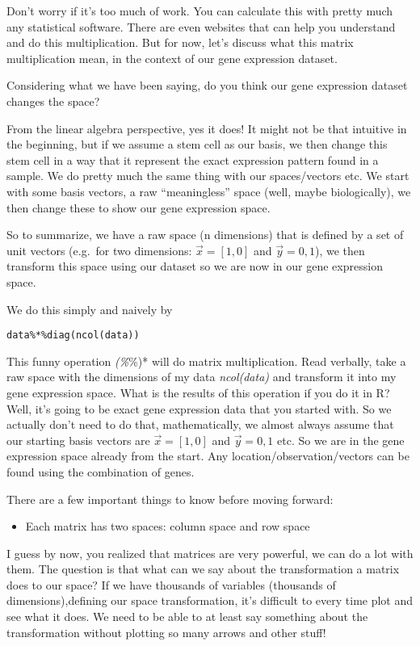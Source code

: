\documentclass[
]{book}
\providecommand{\tightlist}{%
  \setlength{\itemsep}{0pt}\setlength{\parskip}{0pt}}
\theoremstyle{definition}
\theoremstyle{definition}
\theoremstyle{definition}
\theoremstyle{remark}
\begin{document}
Don't worry if it's too much of work. You can calculate this with pretty much any statistical software. There are even websites that can help you understand and do this multiplication. But for now, let's discuss what this matrix multiplication mean, in the context of our gene expression dataset.

Considering what we have been saying, do you think our gene expression dataset changes the space?

From the linear algebra perspective, yes it does! It might not be that intuitive in the beginning, but if we assume a stem cell as our basis, we then change this stem cell in a way that it represent the exact expression pattern found in a sample. We do pretty much the same thing with our spaces/vectors etc. We start with some basis vectors, a raw ``meaningless'' space (well, maybe biologically), we then change these to show our gene expression space.

So to summarize, we have a raw space (n dimensions) that is defined by a set of unit vectors (e.g.~for two dimensions: \(\vec{x}=[1,0]\) and \(\vec{y}={0,1}\)), we then transform this space using our dataset so we are now in our gene expression space.

We do this simply and naively by

\begin{verbatim}
data%*%diag(ncol(data))
\end{verbatim}

This funny operation \emph{(\%}\%)* will do matrix multiplication. Read verbally, take a raw space with the dimensions of my data \emph{ncol(data)} and transform it into my gene expression space. What is the results of this operation if you do it in R? Well, it's going to be exact gene expression data that you started with. So we actually don't need to do that, mathematically, we almost always assume that our starting basis vectors are \(\vec{x}=[1,0]\) and \(\vec{y}={0,1}\) etc. So we are in the gene expression space already from the start. Any location/observation/vectors can be found using the combination of genes.

There are a few important things to know before moving forward:

\begin{itemize}
\tightlist
\item
  Each matrix has two spaces: column space and row space
\end{itemize}

I guess by now, you realized that matrices are very powerful, we can do a lot with them. The question is that what can we say about the transformation a matrix does to our space?
If we have thousands of variables (thousands of dimensions),defining our space transformation, it's difficult to every time plot and see what it does. We need to be able to at least say something about the transformation without plotting so many arrows and other stuff!
\end{document}

